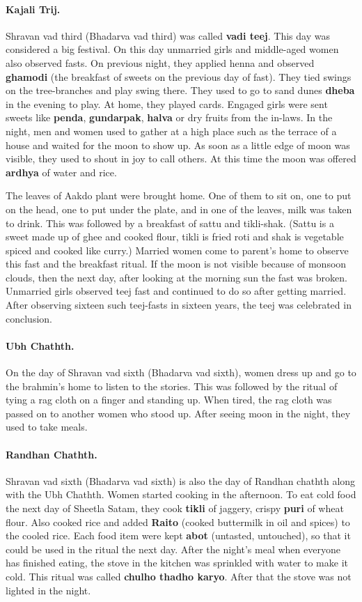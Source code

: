 \paragraph{Kajali Trij.} Shravan vad third (Bhadarva vad third)
was called \textbf{vadi teej}. This day was considered a big festival. On this
day unmarried girls and middle-aged women also observed fasts. On previous
night, they applied henna and observed \textbf{ghamodi} (the breakfast of
sweets on the previous day of fast). They tied swings on the tree-branches and
play swing there. They used to go to sand dunes \textbf{dheba} in the evening
to play. At home, they played cards. Engaged girls were sent sweets like
\textbf{penda}, \textbf{gundarpak}, \textbf{halva} or dry fruits from the
in-laws. In the night, men and women used to gather at a high place such as the
terrace of a house and waited for the moon to show up. As soon as a little edge
of moon was visible, they used to shout in joy to call others. At this time the
moon was offered \textbf{ardhya} of water and rice.

The leaves of Aakdo plant were brought home. One of them to sit on, one to put
on the head, one to put under the plate, and in one of the leaves, milk was
taken to drink. This was followed by a breakfast of sattu and tikli-shak. (Sattu
is a sweet made up of ghee and cooked flour, tikli is fried roti and shak is
vegetable spiced and cooked like curry.) Married women come to parent's home to
observe this fast and the breakfast ritual. If the moon is not visible because
of monsoon clouds, then the next day, after looking at the morning sun the fast
was broken. Unmarried girls observed teej fast and continued to do so after
getting married. After observing sixteen such teej-fasts in sixteen years, the
teej was celebrated in conclusion.
\paragraph{Ubh Chathth.} On the day of Shravan vad sixth (Bhadarva vad sixth),
women dress up and go to the brahmin's home to listen to  the stories. This was
followed by the ritual of tying a rag cloth on a finger and standing up. When
tired, the rag cloth was passed on to another women who stood up. After seeing
moon in the night, they used to take meals.
\paragraph{Randhan Chathth.} Shravan vad sixth (Bhadarva vad sixth) is also the
day of Randhan chathth along with the Ubh Chathth. Women started cooking in the
afternoon. To eat cold food the next day of Sheetla Satam, they cook
\textbf{tikli} of jaggery, crispy \textbf{puri} of wheat flour. Also cooked rice
and added \textbf{Raito} (cooked buttermilk in oil and spices) to the cooled
rice. Each food item were kept \textbf{abot} (untasted, untouched), so that it
could be used in the ritual the next day. After the night's meal when everyone
has finished eating, the stove in the kitchen was sprinkled with water to make
it cold. This ritual was called \textbf{chulho thadho karyo}. After that the
stove was not lighted in the night.
